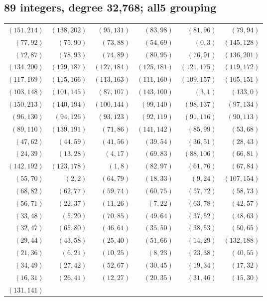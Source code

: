 \subsection*{89 integers, degree 32,768; all5 grouping}
\begingroup\small
\begin{longtable}{rrrrrr}
$(151,214)$ & $(138,202)$ & $(95,131)$ & $(83,98)$ & $(81,96)$ & $(79,94)$\\
$(77,92)$ & $(75,90)$ & $(73,88)$ & $(54,69)$ & $(0,3)$ & $(145,128)$\\
$(72,87)$ & $(78,93)$ & $(74,89)$ & $(80,95)$ & $(76,91)$ & $(136,201)$\\
$(134,200)$ & $(129,187)$ & $(127,184)$ & $(125,181)$ & $(121,175)$ & $(119,172)$\\
$(117,169)$ & $(115,166)$ & $(113,163)$ & $(111,160)$ & $(109,157)$ & $(105,151)$\\
$(103,148)$ & $(101,145)$ & $(87,107)$ & $(143,100)$ & $(3,1)$ & $(133,0)$\\
$(150,213)$ & $(140,194)$ & $(100,144)$ & $(99,140)$ & $(98,137)$ & $(97,134)$\\
$(96,130)$ & $(94,126)$ & $(93,123)$ & $(92,119)$ & $(91,116)$ & $(90,113)$\\
$(89,110)$ & $(139,191)$ & $(71,86)$ & $(141,142)$ & $(85,99)$ & $(53,68)$\\
$(47,62)$ & $(44,59)$ & $(41,56)$ & $(39,54)$ & $(36,51)$ & $(28,43)$\\
$(24,39)$ & $(13,28)$ & $(4,17)$ & $(69,83)$ & $(88,106)$ & $(66,81)$\\
$(142,192)$ & $(123,178)$ & $(1,8)$ & $(82,97)$ & $(61,76)$ & $(67,84)$\\
$(55,70)$ & $(2,2)$ & $(64,79)$ & $(18,33)$ & $(9,24)$ & $(107,154)$\\
$(68,82)$ & $(62,77)$ & $(59,74)$ & $(60,75)$ & $(57,72)$ & $(58,73)$\\
$(56,71)$ & $(22,37)$ & $(11,26)$ & $(7,22)$ & $(63,78)$ & $(42,57)$\\
$(33,48)$ & $(5,20)$ & $(70,85)$ & $(49,64)$ & $(37,52)$ & $(48,63)$\\
$(32,47)$ & $(65,80)$ & $(46,61)$ & $(35,50)$ & $(38,53)$ & $(50,65)$\\
$(29,44)$ & $(43,58)$ & $(25,40)$ & $(51,66)$ & $(14,29)$ & $(132,188)$\\
$(21,36)$ & $(6,21)$ & $(10,25)$ & $(8,23)$ & $(23,38)$ & $(40,55)$\\
$(34,49)$ & $(27,42)$ & $(52,67)$ & $(30,45)$ & $(19,34)$ & $(17,32)$\\
$(16,31)$ & $(26,41)$ & $(12,27)$ & $(20,35)$ & $(31,46)$ & $(15,30)$\\
$(131,141)$ & & & & &\\
\end{longtable}
\endgroup
